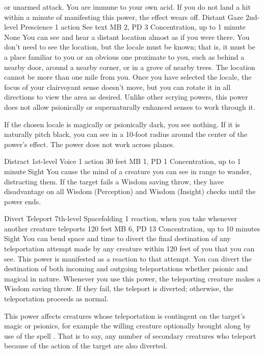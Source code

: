 or unarmed attack. You are immune to your own acid. If you
do not land a hit within a minute of manifesting this power,
the effect wears off.
\DndPowerHeader%
    {Distant Gaze\label{pwr:distant_gaze}}
    {2nd-level Prescience}
    {1 action}
    {See text}
    {MB 2, PD 3}
    {Concentration, up to 1 minute}
    {None}
You can see and hear a distant location almost
as if you were there. You don't need to see the location,
but the locale must be known; that is, it must be a place
familiar to you or an obvious one proximate to you, such as
behind a nearby door, around a nearby corner, or in a grove
of nearby trees.
The location cannot be more than one mile from you.
Once you have selected the locale, the focus
of your clairvoyant sense doesn't move, but you can rotate
it in all directions to view the area as desired. Unlike other
scrying powers, this power does not allow psionically
or supernaturally enhanced senses to work through it.

If the chosen locale is magically or psionically dark, you
see nothing. If it is naturally pitch black, you can see in
a 10-foot radius around the center of the power's effect.
The power does not work across planes.

\DndPowerHeader%
    {Distract\label{pwr:distract}}
    {1st-level Voice}
    {1 action}
    {30 feet}
    {MB 1, PD 1}
    {Concentration, up to 1 minute}
    {Sight}
You cause the mind of a creature
you can see in range to wander, distracting them. If the target
fails a Wisdom saving throw, they have disadvantage on all
Wisdom (Perception) and Wisdom (Insight) checks until the
power ends.

\DndPowerHeader%
    {Divert Teleport\label{pwr:divert_teleport}}
    {7th-level Spacefolding}
    {1 reaction, when you take whenever another creature teleports}
    {120 feet}
    {MB 6, PD 13}
    {Concentration, up to 10 minutes}
    {Sight}
You can bend space and time to divert the
final destination of any teleportation attempt made by any
creature within 120 feet of you that you can see.
This power is manifested as a reaction to that attempt.
You can divert the destination of both incoming and outgoing
teleportations whether psionic and magical in nature. Whenever you use this
power, the teleporting creature makes a Wisdom saving throw.
If they fail, the teleport is diverted; otherwise, the teleportation
proceeds as normal.

This power affects creatures whose teleportation is contingent
on the target's magic or psionics, for example the willing creature
optionally brought along by use of the spell .
That is to say, any number of secondary creatures
who teleport because of the action of the target are also diverted.  

